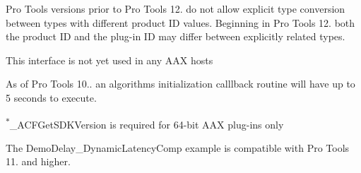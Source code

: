 \begin{DoxyRefList}
\label{a00879__compatibility_notes000013}%
%
 Pro Tools versions prior to Pro Tools 12. do not allow explicit type conversion between types with different product ID values. Beginning in Pro Tools 12. both the product ID and the plug-\/in ID may differ between explicitly related types. 
\item[Module \mbox{\hyperlink{a00908}{Aux\+Interface\+\_\+\+Task\+Agent}} ]\label{a00879__compatibility_notes000002}%
%
 This interface is not yet used in any AAX hosts 
\item[Module \mbox{\hyperlink{a00890}{Common\+Interface\+\_\+\+Algorithm}} ]\label{a00879__compatibility_notes000003}%
%
 As of Pro Tools 10.. an algorithm\textquotesingle{}s initialization calllback routine will have up to 5 seconds to execute. 
\item[Module \mbox{\hyperlink{a00895}{Common\+Interface\+\_\+\+Format\+Specification}} ]\label{a00879__compatibility_notes000006}%
%


\label{a00879__compatibility_notes000005}%
%


\label{a00879__compatibility_notes000004}%
%


\label{a00879__compatibility_notes000007}%
%
 \textsuperscript{$\ast$}{\ttfamily \+\_\+\+ACFGet\+SDKVersion} is required for 64-\/bit AAX plug-\/ins only 
\item[Module \mbox{\hyperlink{a00946}{Example\+Plug\+Ins}} ]\label{a00879__compatibility_notes000015}%
%
 The Demo\+Delay\+\_\+\+Dynamic\+Latency\+Comp example is compatible with Pro Tools 11. and higher.
\end{DoxyRefList}